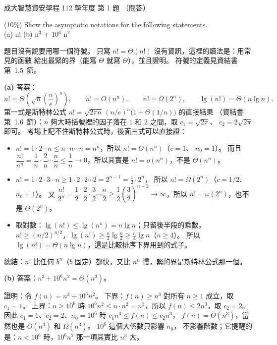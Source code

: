 \begin{pastexam}[label={px:ncku-112-isec-ds-01}]{成大智慧資安學程 112 學年度 第 1 題}
（問答）

(10\%) Show the asymptotic notations for the following statements.\\
(a) n! \qquad (b) n$^3$ + 10$^6$ n$^2$
\end{pastexam}

\begin{pastsoln}
題目沒有說要用哪一個符號。 只寫 $n! = \Theta(n!)$ 沒有資訊，這裡的讀法是：用常見的函數
給出最緊的界（能寫 $\Theta$ 就寫 $\Theta$），並且證明。 符號的定義見資結書第~1.5~節。

\textbf{(a)} 答案：
\[
n! = \Theta\!\left(\sqrt{n}\left(\frac{n}{e}\right)^{n}\right),\qquad
n! = O(n^n),\qquad n! = \Omega(2^n),\qquad \lg(n!) = \Theta(n \lg n).
\]
第一式是斯特林公式 $n! = \sqrt{2\pi n}\,(n/e)^n\bigl(1 + \Theta(1/n)\bigr)$ 的直接結果
（資結書第~1.6~節）：$n$ 夠大時括號裡的因子落在 $1$ 和 $2$ 之間，取 $c_1 = \sqrt{2\pi}$、
$c_2 = 2\sqrt{2\pi}$ 即可。 考場上記不住斯特林公式時，後面三式可以直接證：
\begin{itemize}
\item $n! = 1 \cdot 2 \cdots n \le n \cdot n \cdots n = n^n$，所以 $n! = O(n^n)$（$c = 1$、
$n_0 = 1$）。 而且 $\dfrac{n!}{n^n} = \dfrac{1}{n}\cdot\dfrac{2}{n}\cdots\dfrac{n}{n} \le \dfrac{1}{n}
\to 0$，所以其實是 $n! = o(n^n)$，不是 $\Theta(n^n)$。
\item $n! = 1 \cdot 2 \cdot 3 \cdots n \ge 1 \cdot 2 \cdot 2 \cdots 2 = 2^{n-1} = \tfrac12 \cdot 2^n$，
所以 $n! = \Omega(2^n)$（$c = 1/2$、$n_0 = 1$）。 又
$\dfrac{n!}{2^n} = \dfrac{1}{2}\cdot\dfrac{2}{2}\cdot\dfrac{3}{2}\cdots\dfrac{n}{2}
\ge \dfrac12\left(\dfrac32\right)^{n-2} \to \infty$，所以 $n! = \omega(2^n)$，也不是 $\Theta(2^n)$。
\item 取對數：$\lg(n!) \le \lg(n^n) = n\lg n$；只留後半段的乘數，
$n! \ge (n/2)^{n/2}$，$\lg(n!) \ge \frac{n}{2}\lg\frac{n}{2} \ge \frac{n}{4}\lg n$（$n \ge 4$）。
所以 $\lg(n!) = \Theta(n\lg n)$，這是比較排序下界用到的式子。
\end{itemize}
總結：$n!$ 比任何 $b^n$（$b$ 固定）都快，又比 $n^n$ 慢，緊的界是斯特林公式那一個。

\textbf{(b)} 答案：$n^3 + 10^6 n^2 = \Theta(n^3)$。

證明：令 $f(n) = n^3 + 10^6 n^2$。 下界：$f(n) \ge n^3$ 對所有 $n \ge 1$ 成立，取 $c_1 = 1$。
上界：$n \ge 10^6$ 時 $10^6 n^2 \le n \cdot n^2 = n^3$，所以 $f(n) \le 2n^3$，取 $c_2 = 2$。
因此 $c_1 = 1$、$c_2 = 2$、$n_0 = 10^6$ 時 $c_1 n^3 \le f(n) \le c_2 n^3$，
$f(n) = \Theta(n^3)$，當然也是 $O(n^3)$ 和 $\Omega(n^3)$。 $10^6$ 這個大係數只影響 $n_0$，
不影響階數；它提醒的是：$n < 10^6$ 時，$10^6 n^2$ 那一項其實比 $n^3$ 大。
\end{pastsoln}
